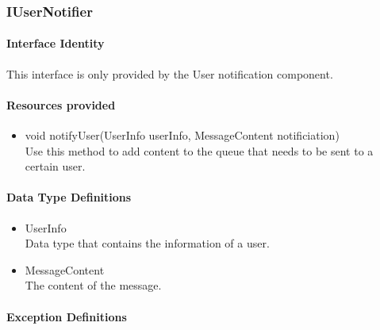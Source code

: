 \subsubsection{IUserNotifier}
\paragraph{Interface Identity}
This interface is only provided by the User notification component.
\paragraph{Resources provided}
\begin{itemize}
	\item{void notifyUser(UserInfo userInfo, MessageContent notificiation)}\\
	Use this method to add content to the queue that needs
		to be sent to a certain user.
\end{itemize}
\paragraph{Data Type Definitions}
\begin{itemize}
	\item UserInfo\\
	Data type that contains the information of a user.
	\item MessageContent\\
	The content of the message.
\end{itemize}
\paragraph{Exception Definitions}
